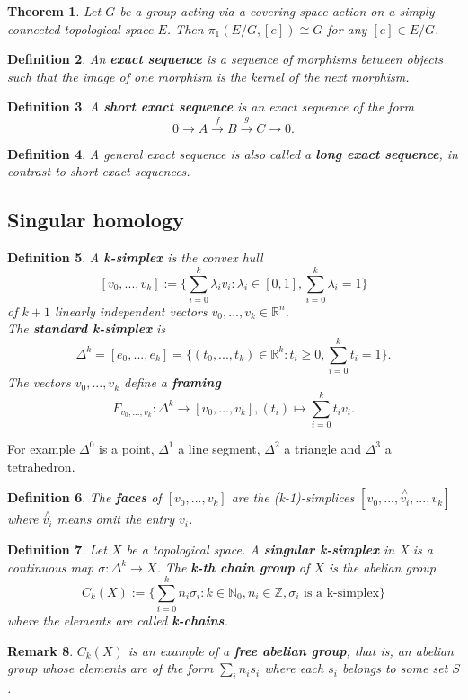\documentclass{article}
\newtheorem{theorem}{Theorem}[section]
\newtheorem{definition}[theorem]{Definition}
\newtheorem{remark}[theorem]{Remark}
\begin{document}
\begin{theorem}
Let $G$ be a group acting via a covering space action on a simply connected topological space $E$. Then $\pi_1(E/G,[e])\cong G$ for any $[e]\in E/G$.
\end{theorem}

\begin{definition}
An \textbf{exact sequence} is a sequence of morphisms between objects such that the image of one morphism is the kernel of the next morphism.
\end{definition}

\begin{definition}
A \textbf{short exact sequence} is an exact sequence of the form\[0\longrightarrow A\overset{f}{\longrightarrow}B\overset{g}{\longrightarrow}C\longrightarrow0.\]
\end{definition}
\begin{definition}
A general exact sequence is also called a \textbf{long exact sequence}, in contrast to short exact sequences.
\end{definition}

\subsection{Singular homology}
\begin{definition}
A \textbf{k-simplex} is the convex hull\[[v_0,...,v_k]:=\{\sum_{i=0}^k\lambda_iv_i:\lambda_i\in [0,1],\sum_{i=0}^k\lambda_i=1\}\]
of $k+1$ linearly independent vectors $v_0,...,v_k\in\mathbb{R}^n$.\\
The \textbf{standard k-simplex} is\[\Delta^k=[e_0,...,e_k]=\{(t_0,...,t_k)\in\mathbb{R}^k:t_i\geq 0, \sum_{i=0}^kt_i=1\}.\]
The vectors $v_0,...,v_k$ define a \textbf{framing} \[F_{v_0,...,v_k}\colon\Delta^k\rightarrow [v_0,...,v_k],(t_i)\mapsto \sum_{i=0}^kt_iv_i.\]
\end{definition}


\noindent For example $\Delta^0$ is a point, $\Delta^1$ a line segment, $\Delta^2$ a triangle and $\Delta^3$ a tetrahedron.

\begin{definition}
The \textbf{faces} of $[v_0,...,v_k]$ are the (k-1)-simplices $[v_0,...,\overset{\wedge}{v_i},...,v_k]$ where $\overset{\wedge}{v_i}$ means omit the entry $v_i$.
\end{definition}

\begin{definition}
Let $X$ be a topological space. A \textbf{singular k-simplex} in X is a continuous map $\sigma\colon\Delta^k\to X$. The \textbf{k-th chain group} of $X$ is the abelian group\[C_k(X):=\{\sum_{i=0}^kn_i\sigma_i:k\in\mathbb{N}_0,n_i\in\mathbb{Z},\sigma_i \text{ is a k-simplex}\}\] where the elements are called \textbf{k-chains}.
\end{definition}
\begin{remark}
$C_k(X)$ is an example of a \textbf{free abelian group}; that is, an abelian group whose elements are of the form $\sum_in_is_i$ where each $s_i$ belongs to some set $S$.
\end{remark}
\end{document}
